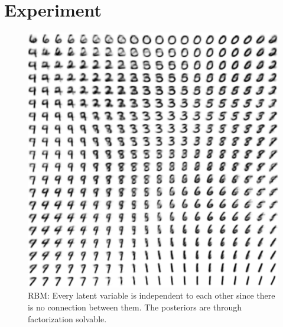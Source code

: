 \documentclass[conference]{IEEEtran}
\begin{document}
\section{Experiment}
\begin{figure}[ht]
  \centering
  \includegraphics[scale=0.25]{picture4.png}
     \caption{RBM: Every latent variable is independent to each other since there is no connection between them. The posteriors are through factorization solvable.}\label{pic_4}
\end{figure}

%
%
\end{document}
